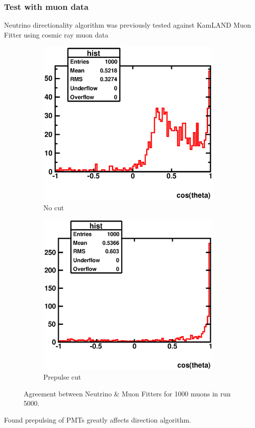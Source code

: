 \documentclass{beamer}
\begin{document}
\begin{frame}
	\frametitle{Test with muon data}
	Neutrino directionality algorithm was previously tested against KamLAND Muon
	Fitter using cosmic ray muon data
	\begin{figure}
		\centering
		\begin{subfigure}[h]{0.45\textheight}
			\includegraphics[width=\textwidth]
			{analyzed_rtq_atm_muon_run005000_badnessMax20_agreementWithMuonFitter}
			\caption{No cut}
		\end{subfigure}
		\begin{subfigure}[h]{0.45\textheight}
			\includegraphics[width=\textwidth]
			{analyzed_rtq_atm_muon_run005000_badnessMax20_noEarlyNorLateHits_agreementWithMuonFitter}
			\caption{Prepulse cut}
		\end{subfigure}
		\caption{Agreement between Neutrino \& Muon Fitters for 1000 muons in run 5000.}
	\end{figure}
	Found prepulsing of PMTs greatly affects direction algorithm.
\end{frame}
\end{document}
